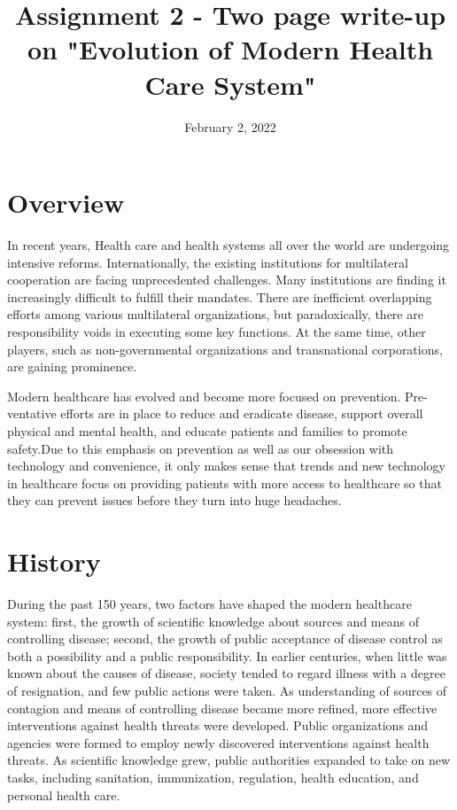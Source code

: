 \documentclass{article}
\title{Assignment 2 - Two page write-up on "Evolution of Modern Health Care System"}
\date{February 2, 2022}
\begin{document}
\maketitle
\section{Overview}
 In recent years, Health care and health systems all over the world are undergoing intensive reforms. Internationally, the existing institutions for multilateral cooperation are facing unprecedented challenges. Many institutions are finding it increasingly difficult to fulfill their mandates. There are inefficient overlapping efforts among various multilateral organizations, but paradoxically, there are responsibility voids in executing some key functions. At the same time, other players, such as non-governmental organizations and transnational corporations, are gaining prominence.
 
 Modern healthcare has evolved and become more focused on prevention. Pre-ventative efforts are in place to reduce and eradicate disease, support overall physical and mental health, and educate patients and families to promote safety.Due to this emphasis on prevention as well as our obsession with technology and convenience, it only makes sense that trends and new technology in healthcare focus on providing patients with more access to healthcare so that they can prevent issues before they turn into huge headaches.
 \section{History}
 During the past 150 years, two factors have shaped the modern healthcare system: first, the growth of scientific knowledge about sources and means of controlling disease; second, the growth of public acceptance of disease control as both a possibility and a public responsibility. In earlier centuries, when little was known about the causes of disease, society tended to regard illness with a degree of resignation, and few public actions were taken. As understanding of sources of contagion and means of controlling disease became more refined, more effective interventions against health threats were developed. Public organizations and agencies were formed to employ newly discovered interventions against health threats. As scientific knowledge grew, public authorities expanded to take on new tasks, including sanitation, immunization, regulation, health education, and personal health care.
\end{document}
